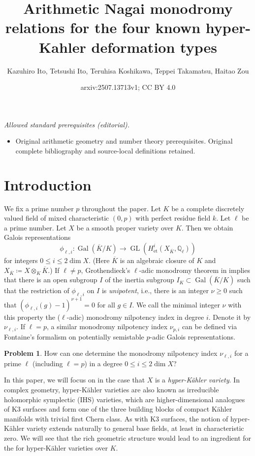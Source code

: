 \documentclass[12pt,reqno]{amsart}
\title{Arithmetic Nagai monodromy relations for the four known hyper-Kahler deformation types}
\author{Kazuhiro Ito, Tetsushi Ito, Teruhisa Koshikawa, Teppei Takamatsu, Haitao Zou}
\date{arxiv:2507.13713v1; CC BY 4.0}
\theoremstyle{definition}
\newtheorem{prob}[thm]{Problem}
\newcommand{\Q}{{\mathds Q}}
\newcommand\Gal{\mathop{\mathrm{Gal}}\nolimits}
\newcommand\GL{\mathop{\mathrm{GL}}\nolimits}
\newcommand{\et}{\mathrm{\acute{e}t}}
\numberwithin{equation}{section}
\begin{document}
\maketitle
\noindent\textit{Allowed standard prerequisites (editorial).}\begin{itemize}
\item Original arithmetic geometry and number theory prerequisites. Original complete bibliography and source-local definitions retained.
\end{itemize}\medskip
\section{Introduction} \label{Section:Introduction}

We fix a prime number $p$ throughout the paper.
Let $K$ be a complete discretely valued field of mixed characteristic $(0, p)$ with perfect residue field $k$. Let $\ell$ be a prime number.
Let $X$ be a smooth proper variety over $K$. Then we obtain Galois representations
\[
\phi_{\ell,i}\colon \Gal (\overline{K}/K) \rightarrow \GL ( H^i_{\et} (X_{\overline{K}}, \Q_{\ell}))
\]
for integers $0 \leq i \leq 2 \dim X$.
(Here $\overline{K}$ is an algebraic closure of $K$ and $X_{\overline{K}}\coloneqq X \otimes_K \overline{K}$.)
If $\ell \neq p$, Grothendieck's $\ell$-adic monodromy theorem in \cite{SGA7-I} implies that there is an open subgroup $I$ of the inertia subgroup $I_K \subset \Gal(\overline{K}/K)$ such that the restriction of $\phi_{\ell,i}$ on $I$ is \emph{unipotent}, i.e., there is an integer $\nu \geq 0$ such that 
$(\phi_{\ell,i}(g) -1 )^{\nu+1} =0$ for all $g \in I$.
We call the minimal integer $\nu$ with this property the ($\ell$-adic) monodromy nilpotency index in degree $i$. Denote it by $\nu_{\ell, i}$. If $\ell =p$, a similar monodromy nilpotency index $\nu_{p, i}$ can be defined via Fontaine's formalism on potentially semistable $p$-adic Galois representations.

\begin{prob}\label{Motivation}
How can one determine the monodromy nilpotency index $\nu_{\ell,i}$ for a prime $\ell$ (including $\ell = p$) in a degree $0 \leq i \leq 2 \dim X$?  
\end{prob}

In this paper, we will focus on  in the case that $X$ is a \emph{hyper-Kähler variety}. In complex geometry, hyper-Kähler varieties are also known as irreducible holomorphic symplectic (IHS) varieties, which are higher-dimensional analogues of K3 surfaces and form one of the three building blocks of compact Kähler manifolds with trivial first Chern class.
As with K3 surfaces, the notion of hyper-Kähler variety extends naturally to general base fields, at least in characteristic zero. 
We will see that the rich geometric structure would lead to an ingredient for the  for hyper-Kähler varieties over $K$. 
\end{document}
